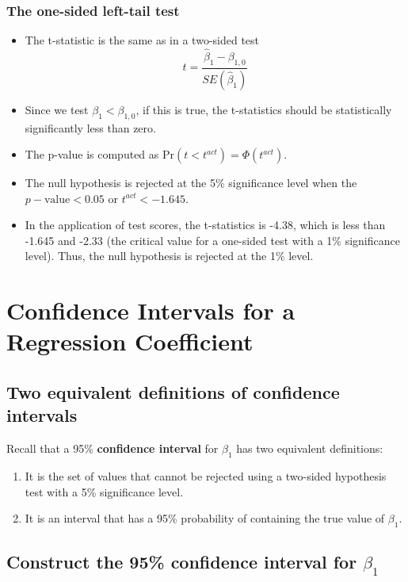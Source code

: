 \documentclass[a4paper,11pt]{article}
\newcommand{\pr}{\mathrm{Pr}}
\begin{document}
\subsubsection*{The one-sided left-tail test}
\label{sec:orga372dbe}

\begin{itemize}
\item The t-statistic is the same as in a two-sided test
\[ t = \frac{\hat{\beta}_1 - \beta_{1,0}}{SE(\hat{\beta}_1)} \]
\item Since we test \(\beta_1 < \beta_{1,0}\), if this is true, the
t-statistics should be statistically significantly less than zero.
\item The p-value is computed as \(\pr(t < t^{act}) = \varPhi(t^{act})\).
\item The null hypothesis is rejected at the 5\% significance level when
the \(p-\text{value} < 0.05\) or \(t^{act} < -1.645\).
\item In the application of test scores, the t-statistics is -4.38, which
is less than -1.645 and -2.33 (the critical value for a one-sided
test with a 1\% significance level). Thus, the null hypothesis is
rejected at the 1\% level.
\end{itemize}


\section{Confidence Intervals for a Regression Coefficient}
\label{sec:org8be7ee7}


\subsection{Two equivalent definitions of confidence intervals}
\label{sec:org5f34f90}

Recall that a 95\% \textbf{confidence interval} for \(\beta_1\) has two equivalent
definitions:
\begin{enumerate}
\item It is the set of values that cannot be rejected using a two-sided
hypothesis test with a 5\% significance level.
\item It is an interval that has a 95\% probability of containing the true
value of \(\beta_1\).
\end{enumerate}

\subsection{Construct the 95\% confidence interval for \(\beta_1\)}
\label{sec:org7a5325d}
\end{document}
